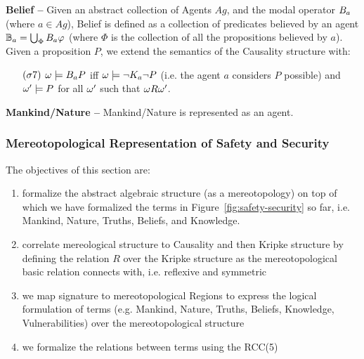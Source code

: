 \begin{definition}{\bf Belief --}\label{def:belief}
	Given an abstract collection of Agents $Ag$, and the modal operator
	$B_{a}$ (where $a\in Ag$), Belief is defined as a collection
	of predicates believed by an agent $\mathbb{B}_{a}=\bigcup_\Phi B_{a}\varphi$
	(where $\Phi$ is the collection of all the propositions believed by $a$).
	Given a proposition $P$, we extend the semantics of the Causality structure with:
	\begin{enumerate}[noitemsep]
		\item[$(\sigma7)$] $\omega\models B_{a}P$ iff
			$\omega\models\neg K_{a}\neg P$ (i.e. the agent $a$ considers $P$ possible) 
			and $\omega'\models P$ for all
			$\omega'$ such that $\omega R\omega'$.
	\end{enumerate}
\end{definition}

\begin{definition}{\bf Mankind/Nature --}\label{def:mankind-nature}
Mankind/Nature is represented as an agent.  
\end{definition}

\subsubsection{Mereotopological Representation of Safety and Security}\label{sec:formalGlossary}
The objectives of this section are:
\begin{enumerate}[noitemsep]
	\item formalize the abstract algebraic structure (as a mereotopology)
		on top of which we have formalized the terms in
		Figure~\ref{fig:safety-security} so far, i.e. Mankind, Nature,
		Truths, Beliefs, and Knowledge.
	\item correlate mereological structure to Causality and then Kripke
		structure by defining the relation $R$ over the Kripke
		structure as the mereotopological basic relation connects with,
		i.e. reflexive and symmetric
	\item we map signature to mereotopological Regions to express the
		logical formulation of terms (e.g. Mankind, Nature, Truths,
		Beliefs, Knowledge, Vulnerabilities) over the mereotopological
		structure
	\item we formalize the relations between terms using the RCC(5)
\end{enumerate}

